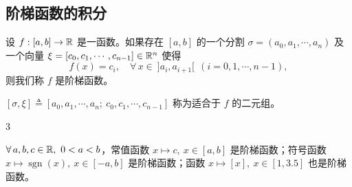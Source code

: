 \subsection{阶梯函数的积分}
	\label{sec:5-1-2}

\begin{mydef*}{}

	设 \(f:[a,b]\to\mathbb{R}\) 是一函数。如果存在 \([a,b]\) 的一个分割 \(\sigma=(a_0,a_1,\cdots,a_n)\) 及一个向量 \(\xi=[c_0,c_1,\cdots,c_{n-1}]\in\mathbb{R}^n\) 使得
	\[
	f(x)=c_i,\quad \forall\,x\in\ ]a_i,a_{i+1}[\ \ (i=0,1,\cdots,n-1),
	\]
	则我们称 \(f\) 是阶梯函数。

\end{mydef*}

\([\sigma,\xi]\triangleq[a_0,a_1,\cdots,a_n;\ c_0,c_1,\cdots,c_{n-1}]\) 称为适合于 \(f\) 的二元组。

\begin{sourceexample}{3}

	\(\forall\,a,b,c\in\R,\ 0<a<b\)，常值函数 \(x\longmapsto c,\ x\in[a,b]\) 是阶梯函数；符号函数 \(x\longmapsto\operatorname{sgn}(x),\ x\in[-a,b]\) 是阶梯函数；函数 \(x\longmapsto[x],\ x\in[1,3.5]\) 也是阶梯函数。

\end{sourceexample}

